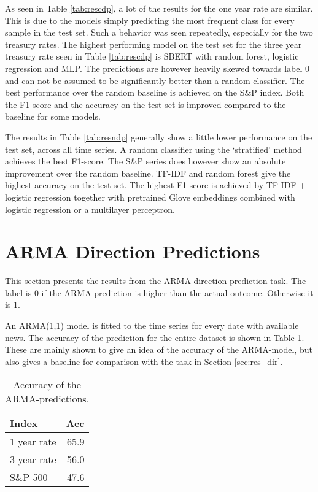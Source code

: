 As seen in Table \ref{tab:rescdp}, a lot of the results for the one year rate are similar. This is due to the models simply predicting the most frequent class for every sample in the test set. Such a behavior was seen repeatedly, especially for the two treasury rates. The highest performing model on the test set for the three year treasury rate seen in Table \ref{tab:rescdp} is SBERT with random forest, logistic regression and MLP. The predictions are however heavily skewed towards label 0 and can not be assumed to be significantly better than a random classifier.
The best performance over the random baseline is achieved on the S\&P index. Both the F1-score and the accuracy on the test set is improved compared to the baseline for some models. 

The results in Table \ref{tab:resndp} generally show a little lower performance on the test set, across all time series. A random classifier using the `stratified' method achieves the best F1-score. The S\&P series does however show an absolute improvement over the random baseline. TF-IDF and random forest give the highest accuracy on the test set. The highest F1-score is achieved by TF-IDF + logistic regression together with pretrained Glove embeddings  combined with logistic regression or a multilayer perceptron. 

\section{ARMA Direction Predictions}\label{sec:res_arma}

This section presents the results from the ARMA direction prediction task. The label is 0 if the ARMA prediction is higher than the actual outcome. Otherwise it is 1. 

An ARMA(1,1) model is fitted to the time series for every date with available news. The accuracy of the prediction for the entire dataset is shown in Table \ref{tab:arma_acc}. These are mainly shown to give an idea of the accuracy of the ARMA-model, but also gives a baseline for comparison with the task in Section \ref{sec:res_dir}.

\begin{table}[h]
    \centering
    \begin{tabular}{lr}
         \textbf{Index} &  \textbf{Acc}\\
         \hline \hline 
         1 year rate & 65.9 \\
         3 year rate & 56.0 \\
         S\&P 500 & 47.6 \\
         \hline 
    \end{tabular}
    \caption{Accuracy of the ARMA-predictions. }
    \label{tab:arma_acc}
\end{table}

